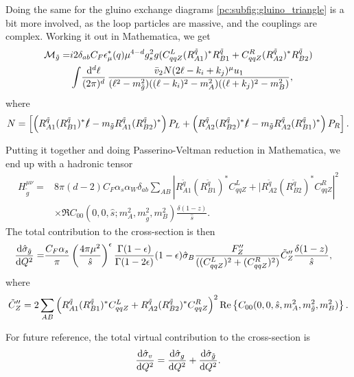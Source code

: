 \documentclass[../main.tex]{subfiles}
\begin{document}
Doing the same for the gluino exchange diagrams \cref{pc:subfig:gluino_triangle} is a bit more involved, as the loop particles are massive, and the couplings are complex.
Working it out in Mathematica, we get
\begin{align}
  \nonumber
  \M_{\tilde{g}} = & i2\delta_{ab} C_F \epsilon_\mu^\ast(q) \mu^{4-d} g_s^2 g (C_{qqZ}^L (R_{A1}^{\tilde{q}})^\ast R_{B1}^{\tilde{q}} + C_{qqZ}^R (R_{A2}^{\tilde{q}})^\ast R_{B2}^{\tilde{q}}) \\
                   & \loopintegral[d]{\ell} \frac{\bar{v}_2 N (2\ell-k_i+k_j)\^\mu u_1}{(\ell^2-m_{\tilde{g}}^2) ((\ell-k_i)^2 - m_A^2)((\ell+k_j)^2 - m_B^2)},
\end{align}
where
\begin{equation}
  N = \bclosed{\pclosed{R_{A1}^{\tilde{q}}(R_{B1}^{\tilde{q}})^\ast\slashed{\ell} - m_{\tilde{g}}R_{A1}^{\tilde{q}}(R_{B2}^{\tilde{q}})^\ast}P_L + \pclosed{R_{A2}^{\tilde{q}}(R_{B2}^{\tilde{q}})^\ast\slashed{\ell} - m_{\tilde{g}}R_{A2}^{\tilde{q}}(R_{B1}^{\tilde{q}})^\ast}P_R}.
\end{equation}

Putting it together and doing Passerino-Veltman reduction in Mathematica, we end up with a hadronic tensor
\begin{align}
  H^{\mu\nu}_{\tilde{g}} = & 8\pi (d-2) C_F \alpha_s \alpha_W \delta_{ab} \sum_{AB} \left|R^{\tilde{q}}_{A1}(R^{\tilde{q}}_{B1})^\ast C_{qqZ}^L + |R^{\tilde{q}}_{A2}(R^{\tilde{q}}_{B2})^\ast C_{qqZ}^R\right|^2 \\
                           & \times \Re{C_{00}(0,0,\hat{s};m_A^2, m_{\tilde{g}}^2, m_B^2)} \frac{\delta(1-z)}{\hat{s}}.
\end{align}
The total contribution to the cross-section is then
\begin{align}
  \d[Q^2]{\hat\sigma_{\tilde{g}}} = & \frac{C_F \alpha_s}{\pi} \pclosed{\frac{4\pi \mu^2}{\hat{s}}}^\epsilon \frac{\Gamma(1-\epsilon)}{\Gamma(1-2\epsilon)} (1-\epsilon) \hat\sigma_B \frac{F^{\prime\prime}_Z}{((C_{qqZ}^L)^2 + (C_{qqZ}^R)^2)} \tilde{C}^{\prime\prime}_Z \frac{\delta(1-z)}{\hat{s}},
\end{align}
where
\begin{align}
  \tilde{C}^{\prime\prime}_Z = 2\sum_{AB} \pclosed{R^{\tilde{q}}_{A1}(R^{\tilde{q}}_{B1})^\ast C_{qqZ}^L + R^{\tilde{q}}_{A2}(R^{\tilde{q}}_{B2})^\ast C_{qqZ}^R}^2 \Re{C_{00}(0,0,\hat{s},m_A^2,m_{\tilde{g}}^2,m_B^2)}.
\end{align}

For future reference, the total virtual contribution to the cross-section is
\begin{equation}
  \label{pc:eq:sigma_v}
  \d[Q^2]{\hat\sigma_v} = \d[Q^2]{\hat\sigma_g} + \d[Q^2]{\hat\sigma_{\tilde{g}}}.
\end{equation}
\end{document}

